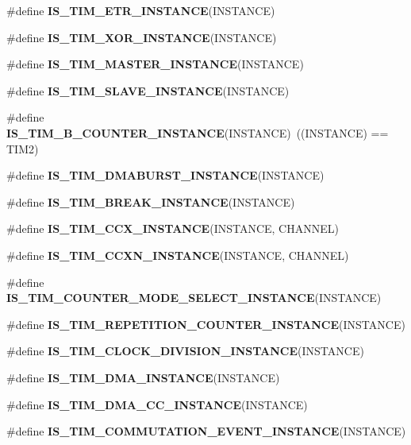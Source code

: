 \begin{DoxyCompactItemize}
\#define {\bfseries I\+S\+\_\+\+T\+I\+M\+\_\+\+E\+T\+R\+\_\+\+I\+N\+S\+T\+A\+N\+CE}(I\+N\+S\+T\+A\+N\+CE)
\item 
\#define {\bfseries I\+S\+\_\+\+T\+I\+M\+\_\+\+X\+O\+R\+\_\+\+I\+N\+S\+T\+A\+N\+CE}(I\+N\+S\+T\+A\+N\+CE)
\item 
\#define {\bfseries I\+S\+\_\+\+T\+I\+M\+\_\+\+M\+A\+S\+T\+E\+R\+\_\+\+I\+N\+S\+T\+A\+N\+CE}(I\+N\+S\+T\+A\+N\+CE)
\item 
\#define {\bfseries I\+S\+\_\+\+T\+I\+M\+\_\+\+S\+L\+A\+V\+E\+\_\+\+I\+N\+S\+T\+A\+N\+CE}(I\+N\+S\+T\+A\+N\+CE)
\item 
\mbox{\label{group___exported__macro_gac41867bf288927ff8ff10a85e67a591b}} 
\#define {\bfseries I\+S\+\_\+\+T\+I\+M\+\_\+B\+\_\+\+C\+O\+U\+N\+T\+E\+R\+\_\+\+I\+N\+S\+T\+A\+N\+CE}(I\+N\+S\+T\+A\+N\+CE)~((I\+N\+S\+T\+A\+N\+CE) == T\+I\+M2)
\item 
\#define {\bfseries I\+S\+\_\+\+T\+I\+M\+\_\+\+D\+M\+A\+B\+U\+R\+S\+T\+\_\+\+I\+N\+S\+T\+A\+N\+CE}(I\+N\+S\+T\+A\+N\+CE)
\item 
\#define {\bfseries I\+S\+\_\+\+T\+I\+M\+\_\+\+B\+R\+E\+A\+K\+\_\+\+I\+N\+S\+T\+A\+N\+CE}(I\+N\+S\+T\+A\+N\+CE)
\item 
\#define {\bfseries I\+S\+\_\+\+T\+I\+M\+\_\+\+C\+C\+X\+\_\+\+I\+N\+S\+T\+A\+N\+CE}(I\+N\+S\+T\+A\+N\+CE,  C\+H\+A\+N\+N\+EL)
\item 
\#define {\bfseries I\+S\+\_\+\+T\+I\+M\+\_\+\+C\+C\+X\+N\+\_\+\+I\+N\+S\+T\+A\+N\+CE}(I\+N\+S\+T\+A\+N\+CE,  C\+H\+A\+N\+N\+EL)
\item 
\#define {\bfseries I\+S\+\_\+\+T\+I\+M\+\_\+\+C\+O\+U\+N\+T\+E\+R\+\_\+\+M\+O\+D\+E\+\_\+\+S\+E\+L\+E\+C\+T\+\_\+\+I\+N\+S\+T\+A\+N\+CE}(I\+N\+S\+T\+A\+N\+CE)
\item 
\#define {\bfseries I\+S\+\_\+\+T\+I\+M\+\_\+\+R\+E\+P\+E\+T\+I\+T\+I\+O\+N\+\_\+\+C\+O\+U\+N\+T\+E\+R\+\_\+\+I\+N\+S\+T\+A\+N\+CE}(I\+N\+S\+T\+A\+N\+CE)
\item 
\#define {\bfseries I\+S\+\_\+\+T\+I\+M\+\_\+\+C\+L\+O\+C\+K\+\_\+\+D\+I\+V\+I\+S\+I\+O\+N\+\_\+\+I\+N\+S\+T\+A\+N\+CE}(I\+N\+S\+T\+A\+N\+CE)
\item 
\#define {\bfseries I\+S\+\_\+\+T\+I\+M\+\_\+\+D\+M\+A\+\_\+\+I\+N\+S\+T\+A\+N\+CE}(I\+N\+S\+T\+A\+N\+CE)
\item 
\#define {\bfseries I\+S\+\_\+\+T\+I\+M\+\_\+\+D\+M\+A\+\_\+\+C\+C\+\_\+\+I\+N\+S\+T\+A\+N\+CE}(I\+N\+S\+T\+A\+N\+CE)
\item 
\#define {\bfseries I\+S\+\_\+\+T\+I\+M\+\_\+\+C\+O\+M\+M\+U\+T\+A\+T\+I\+O\+N\+\_\+\+E\+V\+E\+N\+T\+\_\+\+I\+N\+S\+T\+A\+N\+CE}(I\+N\+S\+T\+A\+N\+CE)

\end{DoxyCompactItemize}
